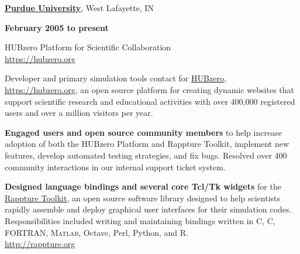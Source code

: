 \documentclass[10pt]{article}
\renewcommand\textit[1]{\underline{\smash{#1}}}
\newcommand{\halfblankline}{\quad\vspace{-0.5\baselineskip}\pagebreak[3]}
\providecommand\Matlab{\textsc{Matlab}}
\newcommand\CC{C\nolinebreak[4]\hspace{-.05em}\raisebox{.4ex}{\relsize{-3}{\textbf{++}}}}
\newcommand\HUBZEROREGISTERED{\href{https://hubzero.org}{HUBzero\textsuperscript{\textregistered}}}
\newcommand\RAPPTURE{\href{http://rappture.org}{Rappture Toolkit}}
\begin{document}
\href{http://www.purdue.edu/}{\textbf{Purdue University}},
West Lafayette, IN
\begin{outerlist}

    \item[] \textit{Software Engineer}%
            \hfill \textbf{February 2005 to present}
    \item[] HUBzero\textsuperscript{\textregistered} Platform for Scientific Collaboration \\
        \url{https://hubzero.org}

        Developer and primary simulation tools contact for
        \HUBZEROREGISTERED, \url{https://hubzero.org}, an open source
        platform for creating dynamic websites that support scientific
        research and educational activities with over 400,000
        registered users and over a million visitors per year.

        \halfblankline

        \begin{innerlist}

            \item \textbf{Engaged users and open source community members} to help
                increase adoption of both the HUBzero Platform and Rappture
                Toolkit, implement new features, develop automated testing
                strategies, and fix bugs. Resolved over 400 community
                interactions in our internal support ticket system.

            \halfblankline

             \item \textbf{Designed language bindings and several core Tcl/Tk widgets}
                for the \RAPPTURE, an open source software library designed to help
                scientists rapidly assemble and deploy graphical user interfaces for
                their simulation codes. Responsibilities included writing and maintaining
                bindings written in C, \CC, FORTRAN, \Matlab, Octave, Perl, Python,
                and R. \\
                \url{http://rappture.org}


            \halfblankline


\end{innerlist}
\end{outerlist}
\end{document}
